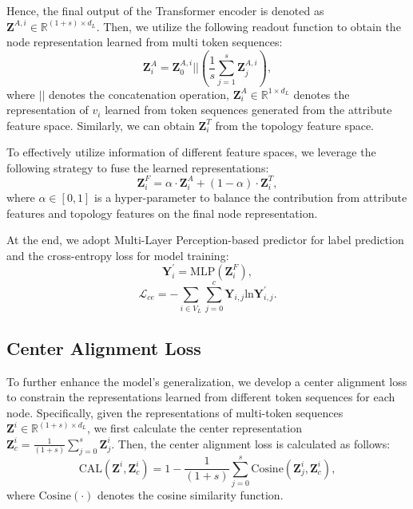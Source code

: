 Hence, the final output of the Transformer encoder is denoted as $\mathbf{Z}^{A,i} \in \mathbb{R}^{(1+s) \times d_L}$.
Then, we utilize the following readout function to obtain the node representation learned from multi token sequences:
\begin{equation}
    \mathbf{Z}^{A}_i = \mathbf{Z}^{A,i}_0||( \frac{1}{s}\sum_{j=1}^{s} \mathbf{Z}^{A,i}_j),
    \label{eq:readout}
\end{equation}
where $||$ denotes the concatenation operation, $\mathbf{Z}^{A}_i\in \mathbb{R}^{1\times d_L}$ denotes the representation of $v_i$ learned from token sequences generated from the attribute feature space.
Similarly, we can obtain $\mathbf{Z}^{T}_i$ from the topology feature space.

To effectively utilize information of different feature spaces, we leverage the following strategy to fuse the learned representations:
\begin{equation}
    \mathbf{Z}^{F}_i = \alpha\cdot\mathbf{Z}^{A}_i + (1-\alpha)\cdot\mathbf{Z}^{T}_i,
    \label{eq:finalrepre}
\end{equation}
where $\alpha \in [0, 1]$ is a hyper-parameter to balance the contribution from attribute features and topology features on the final node representation.

At the end, we adopt Multi-Layer Perception-based predictor for label prediction and the cross-entropy loss for model training:
\begin{equation}
    \mathbf{Y}^{\prime}_i = \mathrm{MLP}(\mathbf{Z}^{F}_i),
    \label{eq:prediction}
\end{equation}
\begin{equation}
        \mathcal{L}_{ce} = -\sum_{i\in V_{L}}\sum_{j = 0}^{c} {\mathbf{Y}_{i,j}}\mathrm{ln}\mathbf{Y}^{\prime}_{i,j}.
    \label{eq:celoss}
\end{equation}




\subsection{Center Alignment Loss}
To further enhance the model's generalization, we develop a center alignment loss to constrain the representations learned from different token sequences for each node.
Specifically, given the representations of multi-token sequences $\mathbf{Z}^{i}\in \mathbb{R}^{(1+s) \times d_L}$, we first calculate the center representation $\mathbf{Z}^{i}_c = \frac{1}{(1+s)}\sum_{j=0}^{s} \mathbf{Z}^{i}_j$.
Then, the center alignment loss is calculated as follows:
\begin{equation}
        \mathrm{CAL}(\mathbf{Z}^{i}, \mathbf{Z}^{i}_c) = 1 - \frac{1}{(1+s)}\sum_{j=0}^{s} \mathrm{Cosine}(\mathbf{Z}^{i}_j, \mathbf{Z}^{i}_c),
    \label{eq:cal}
\end{equation}
where $\mathrm{Cosine}(\cdot)$ denotes the cosine similarity function.

